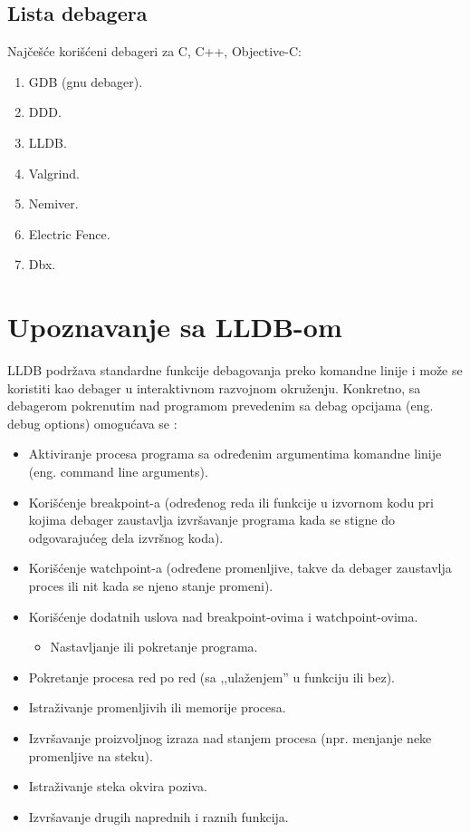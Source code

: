 \documentclass[a4paper]{article}
\begin{document}
\subsection{Lista debagera}
\label{sec:Lista debagera}

Najčešće korišćeni debageri za  C, C++, Objective-C\cite{ll_best_debuggers}\cite{up_best_debuggers}:
\begin{enumerate}
	\item GDB (gnu debager).
	\item DDD. 
	\item LLDB.
	\item Valgrind.
	\item Nemiver.
	\item Electric Fence.
	\item Dbx.
\end{enumerate}

\section{Upoznavanje sa LLDB-om}
LLDB podržava standardne funkcije debagovanja preko komandne linije i može se
koristiti kao debager u interaktivnom razvojnom okruženju. Konkretno, sa
debagerom pokrenutim nad programom prevedenim sa debag opcijama (eng. debug
options) omogućava se \cite{lldb_to_gdb_map}:

\begin{itemize}
	\item{Aktiviranje procesa programa sa određenim argumentima komandne linije
		(eng. command line arguments).}
	
	\item{Korišćenje breakpoint-a (određenog reda ili funkcije u izvornom kodu pri
		kojima debager zaustavlja izvršavanje programa kada se stigne do odgovarajućeg
		dela izvršnog koda).}
	
	\item{Korišćenje watchpoint-a (određene promenljive, takve da debager zaustavlja
		proces ili nit kada se njeno stanje promeni).}
	
	\item{Korišćenje dodatnih uslova nad breakpoint-ovima i watchpoint-ovima.}
	\begin{itemize}
		\item{Nastavljanje ili pokretanje programa.}
	\end{itemize}
	
	\item{Pokretanje procesa red po red (sa ,,ulaženjem'' u funkciju ili bez).}
	
	\item{Istraživanje promenljivih ili memorije procesa.}
	
	\item{Izvršavanje proizvoljnog izraza nad stanjem procesa (npr. menjanje neke
		promenljive na steku).}
	
	\item{Istraživanje steka okvira poziva.}
	
	\item{Izvršavanje drugih naprednih i raznih funkcija.}
\end{itemize}
\end{document}
